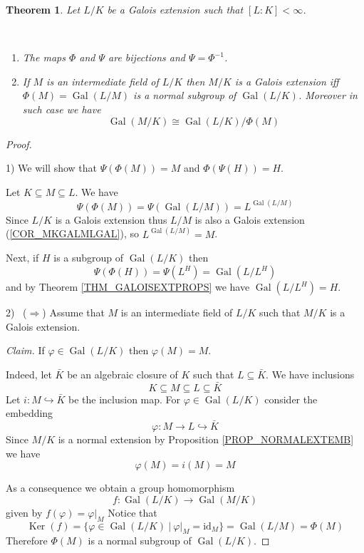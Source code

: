 \documentclass[12pt, letterpaper, oneside]{article}
\theoremstyle{plain}
\newtheorem{theorem}{Theorem}[section]
\theoremstyle{definition}
\newcommand{\hra}{\hookrightarrow}
\newcommand{\id}{\mathrm{id}}
\newcommand{\Ker}{\operatorname{Ker}}
\newcommand{\Gal}{\operatorname{Gal}}
\newcommand{\benu}{\begin{enumerate}}
\newcommand{\eenu}{\end{enumerate}}
\newcommand{\vs}{\vskip 5mm}
\begin{document}
\vs\vs\vs

\begin{theorem}
\label{THM_FUNDGALOISTHM}
Let $L/K$ be a Galois extension such that $[L:K] <\infty$. 

\vskip -13mm 

\ 
\benu
\item The maps $\Phi$ and $\Psi$ are bijections and $\Psi = \Phi^{-1}$.
\item If  $M$  is an intermediate field of $L/K$ then   $M/K$ is 
a Galois extension iff $\Phi(M) = \Gal(L/M)$ is a normal subgroup  of $\Gal(L/K)$. Moreover 
in such case we have 
$$\Gal(M/K)\cong \Gal(L/K)/\Phi(M)$$
\eenu

\end{theorem}

\vs

\begin{proof} \ 

1)  We will show that $\Psi(\Phi(M)) = M$ and $\Phi(\Psi(H)) = H$. 

Let $K\subseteq M \subseteq L$. We have 
$$\Psi(\Phi(M)) = \Psi(\Gal(L/M)) = L^{\Gal(L/M)}$$
Since $L/K$ is a Galois extension thus $L/M$ is also a Galois extension (\ref{COR_MKGALMLGAL}),
so $L^{\Gal(L/M)} = M$. 

Next, if $H$ is a subgroup of $\Gal(L/K)$ then 
$$\Psi(\Phi(H)) = \Psi(L^{H}) = \Gal(L/L^{H})$$
and by  Theorem \ref{THM_GALOISEXTPROPS} we have $\Gal(L/L^{H})= H$.

\vs\vs

2) \ ($\Rightarrow$) Assume that $M$ is an intermediate field of $L/K$ such that 
$M/K$ is a Galois extension. 

\emph{Claim.} If $\varphi \in \Gal(L/K)$ then $\varphi(M) = M$. 

Indeed, let $\bar{K}$ be an algebraic closure of $K$ such that $L\subseteq \bar{K}$. 
We have inclusions
$$K\subseteq M \subseteq L \subseteq \bar{K}$$
Let $i\colon M \hra \bar{K}$ be the inclusion map. For $\varphi\in \Gal(L/K)$ consider 
the embedding 
$$\varphi\colon M \to L \hra \bar{K}$$
Since $M/K$ is a normal extension by  Proposition \ref{PROP_NORMALEXTEMB}
we have
$$\varphi(M) = i(M) = M$$ 

As a consequence we obtain a group homomorphism 
$$f\colon \Gal(L/K) \to \Gal(M/K)$$
given by $f(\varphi) = \varphi|_{M}$
Notice that 
$$\Ker(f) = \{ \varphi\in \Gal(L/K)  \ | \ \varphi|_{M} = \id_{M}\} = \Gal(L/M) = \Phi(M)$$
Therefore $\Phi(M)$ is a normal subgroup of $\Gal(L/K)$. 






\end{proof}
\end{document}
